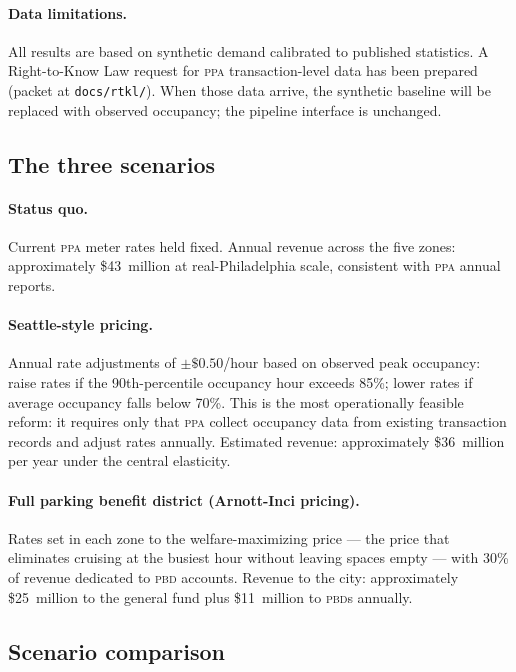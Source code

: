 \documentclass[11pt, letterpaper]{article}
\newcommand{\code}[1]{\texttt{\small #1}}
\newcommand{\pbd}{\textsc{pbd}}
\newcommand{\ppa}{\textsc{ppa}}
\begin{document}
\paragraph{Data limitations.}
All results are based on synthetic demand calibrated to published statistics.
A Right-to-Know Law request for \ppa{} transaction-level data has been
prepared (packet at \code{docs/rtkl/}). When those data arrive, the synthetic
baseline will be replaced with observed occupancy; the pipeline interface is
unchanged.

\subsection{The three scenarios}

\paragraph{Status quo.}
Current \ppa{} meter rates held fixed. Annual revenue across the five zones:
approximately \$43~million at real-Philadelphia scale, consistent with \ppa{}
annual reports.

\paragraph{Seattle-style pricing.}
Annual rate adjustments of $\pm\$0.50$/hour based on observed peak occupancy:
raise rates if the 90th-percentile occupancy hour exceeds 85\%; lower rates
if average occupancy falls below 70\%. This is the most operationally
feasible reform: it requires only that \ppa{} collect occupancy data from
existing transaction records and adjust rates annually. Estimated revenue:
approximately \$36~million per year under the central elasticity.

\paragraph{Full parking benefit district (Arnott-Inci pricing).}
Rates set in each zone to the welfare-maximizing price --- the price that
eliminates cruising at the busiest hour without leaving spaces empty
\cite{arnott2006} --- with 30\% of revenue dedicated to \pbd{} accounts.
Revenue to the city: approximately \$25~million to the general fund plus
\$11~million to \pbd{}s annually.

\subsection{Scenario comparison}
\end{document}
